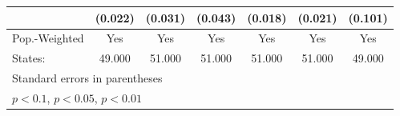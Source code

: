 {\begin{tabular}{l*{6}{c}}
            &     (0.022)         &     (0.031)         &     (0.043)         &     (0.018)         &     (0.021)         &     (0.101)         \\
\hline
Pop.-Weighted&         Yes         &         Yes         &         Yes         &         Yes         &         Yes         &         Yes         \\
States:     &      49.000         &      51.000         &      51.000         &      51.000         &      51.000         &      49.000         \\
\hline\hline
\multicolumn{7}{l}{\footnotesize Standard errors in parentheses}\\
\multicolumn{7}{l}{\footnotesize \sym{*} \(p<0.1\), \sym{**} \(p<0.05\), \sym{***} \(p<0.01\)}\\
\end{tabular}
}
